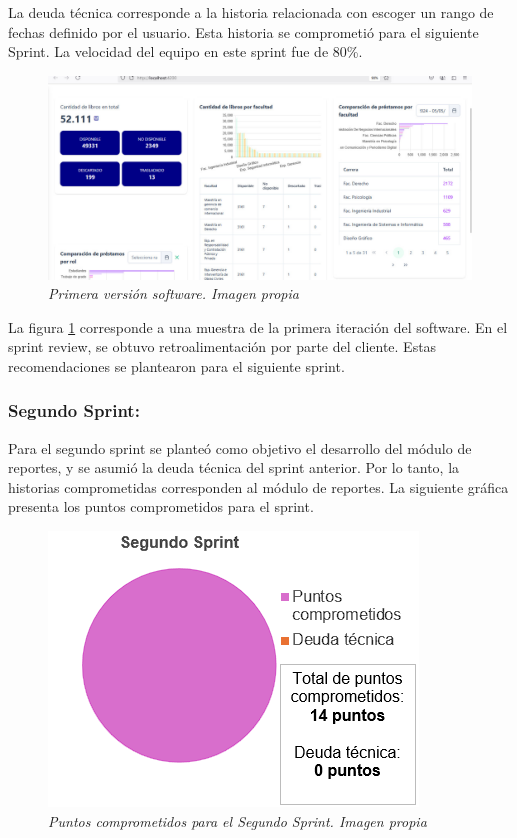 \documentclass[spanish]{ieee_upb}
\begin{document}
La deuda técnica corresponde a la historia relacionada con escoger un rango de fechas definido por el usuario. Esta historia se comprometió para el siguiente Sprint. 
La velocidad del equipo en este sprint fue de 80\%.

\begin{figure}[htpb] 
	\centering
	\includegraphics[width=0.8\linewidth]{img/UX/s1-1.jpg}
	\vspace{-1mm}
	\caption[Primera versión software]{\textit{Primera versión software. Imagen propia}}
	\label{fig:S1-1} 
\end{figure}

La figura \ref{fig:S1-1} corresponde a una muestra de la primera iteración del software. En el sprint review, se obtuvo retroalimentación
por parte del cliente. Estas recomendaciones se plantearon para el siguiente sprint. 


\subsubsection[Segundo Sprint]{Segundo Sprint: }

 Para el segundo sprint se planteó como objetivo el desarrollo del módulo de reportes, y se asumió la deuda técnica del sprint anterior. Por lo tanto, 
 la historias comprometidas corresponden al módulo de reportes. La siguiente gráfica presenta los puntos comprometidos para el sprint.


\begin{figure}[htpb] 
	\centering
	\includegraphics[width=0.4\linewidth]{img/Sprints/S2.png}
	\vspace{-1mm}
	\caption[Puntos comprometidos segundo Sprint]{\textit{Puntos comprometidos para el Segundo Sprint. Imagen propia}}
	\label{fig:S2} 
\end{figure}
\end{document}
